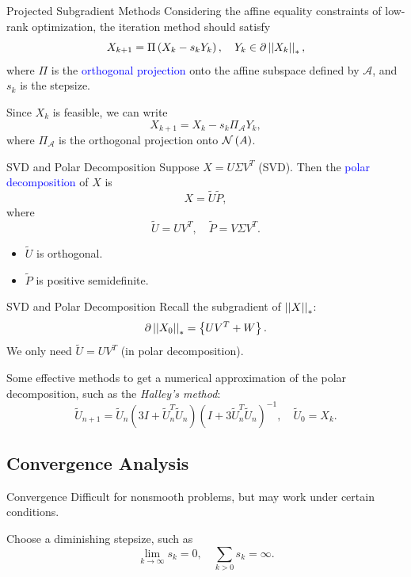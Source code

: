 \documentclass{beamer}
\newcommand{\blue}[1]{\textcolor{blue}{#1}}
\begin{document}
\begin{frame}{Projected Subgradient Methods}
    Considering the affine equality constraints of low-rank optimization, the iteration method should satisfy
    \[X_{k+1}=\Pi\left(X_k-s_kY_k\right),\quad Y_k\in\partial\left|\left|X_k\right|\right|_\ast,\]
    where \(\Pi\) is the \blue{orthogonal projection} onto the affine subspace defined by \(\mathcal A\), and \(s_k\) is the stepsize.
    \pause
    \par Since \(X_k\) is feasible, we can write
    \[X_{k+1}=X_k-s_k\Pi_{\mathcal A}Y_k,\]
    where \(\Pi_{\mathcal A}\) is the orthogonal projection onto \(\mathcal N\left(A\right)\).
\end{frame}

\begin{frame}{SVD and Polar Decomposition}
    Suppose \(X=U\Sigma V^T\) (SVD). Then the \blue{polar decomposition} of \(X\) is
    \[X=\tilde U\tilde P,\]
    where
    \[\tilde U=UV^T,\quad\tilde P=V\Sigma V^T.\]
    \begin{itemize}
        \item \(\tilde U\) is orthogonal.
        \item \(\tilde P\) is positive semidefinite.
    \end{itemize}
\end{frame}

\begin{frame}{SVD and Polar Decomposition}
    Recall the subgradient of \(\left|\left|X\right|\right|_\ast\):
    \[\partial\left|\left|X_0\right|\right|_\ast=\left\{UV^T+W\right\}.\]
    We only need \(\tilde U=UV^T\) (in polar decomposition).
    \pause\par
    Some effective methods to get a numerical approximation of the polar decomposition, such as the \textit{Halley's method}:
    \[\tilde U_{n+1}=\tilde U_n\left(3I+\tilde U_n^T\tilde U_n\right)\left(I+3\tilde U_n^T\tilde U_n\right)^{-1},\quad \tilde U_0=X_k.\]
\end{frame}

\subsection{Convergence Analysis}

\begin{frame}{Convergence}
    Difficult for nonsmooth problems, but may work under certain conditions.\par
    Choose a diminishing stepsize, such as
    \[\lim_{k\to\infty}s_k=0,\quad\sum_{k>0}s_k=\infty.\]
\end{frame}
\end{document}
